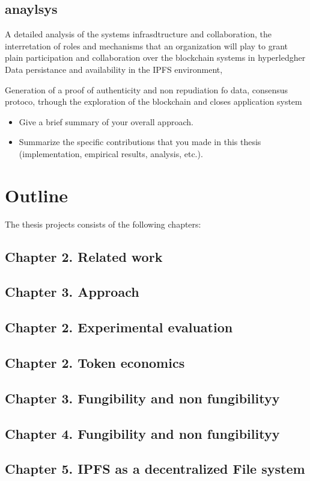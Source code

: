 \subsection{anaylsys}
A detailed analysis of the systems infrasdtructure and collaboration, the interretation of roles and mechanisms that an organization will play to grant plain participation and collaboration over the blockchain systems in hyperledgher
Data persistance and availability in the IPFS environment,

Generation of a proof of authenticity and non repudiation fo data, consensus protoco, trhough the exploration of the blockchain and closes application system

\begin{itemize}
\item Give a brief summary of your overall approach.
\item Summarize the specific contributions that you made in this thesis (implementation, empirical results, analysis, etc.).
\end{itemize}


\section{Outline}
The thesis projects consists of the following chapters:
\subsection{Chapter 2. Related work}
\subsection{Chapter 3. Approach}
\subsection{Chapter 2. Experimental evaluation}
\subsection{Chapter 2. Token economics}
\subsection{Chapter 3. Fungibility and non fungibilityy}
\subsection{Chapter 4. Fungibility and non fungibilityy}
\subsection{Chapter 5. IPFS as a decentralized File system}
